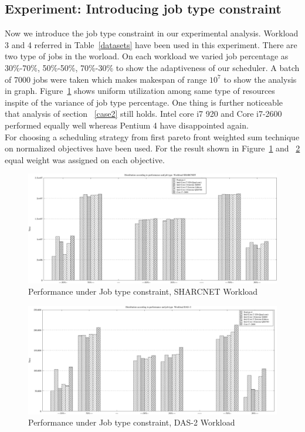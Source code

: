 \subsection{Experiment: Introducing job type constraint}
Now we introduce the job type constraint in our experimental analysis. Workload 3 and 4 referred in Table~\ref{datasets} have been used in this experiment. There are two type of jobs in the worload. On each workload we varied job percentage as 30\%-70\%, 50\%-50\%, 70\%-30\% to show the adaptiveness of our scheduler. 
A batch of 7000 jobs were taken which makes makespan of range $10^{7}$ to show the analysis in graph. Figure~\ref{jobtype1} shows uniform utilization among same type of resources inspite of the variance of job type percentage. One thing is further noticeable that analysis of section ~\ref{case2} still holds. Intel core i7 920 and Core i7-2600 performed equally well whereas Pentium 4 have disappointed again. \\
For choosing a scheduling strategy from first pareto front weighted sum technique on normalized objectives have been used. For the result shown in Figure~\ref{jobtype1} and ~\ref{jobtype2} equal weight was assigned on each objective.
\begin{figure}[h]
\centering
    \includegraphics[width=1.0\columnwidth]{case3_SHARCNET}
    \caption{Performance under Job type constraint, SHARCNET Workload}
\label{jobtype1}
\end{figure}
\begin{figure}[h]
\centering
    \includegraphics[width=1.0\columnwidth]{case3_DAS}
    \caption{Performance under Job type constraint, DAS-2 Workload}
\label{jobtype2}
\end{figure}

